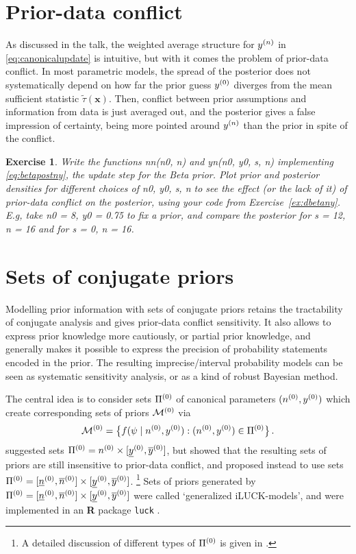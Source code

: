 \documentclass[12pt,a4paper	,twoside]{article}
\newcommand{\bs}[1]{\boldsymbol{#1}}
\renewcommand{\vec}[1]{{\bs#1}}
\newcommand{\code}[1]{\emph{\ttfamily #1}}
\newtheorem{myex}{Exercise}
\begin{document}
\section{Prior-data conflict}

As discussed in the talk, the weighted average structure for $y^{(n)}$ in \eqref{eq:canonicalupdate} is intuitive,
but with it comes the problem of prior-data conflict.
In most parametric models, the spread of the posterior does not systematically depend
on how far the prior guess $y^{(0)}$ diverges from the mean sufficient statistic $\tilde{\tau}(\vec{x})$.
Then, conflict between prior assumptions and information from data is just averaged out,
and the posterior gives a false impression of certainty,
being more pointed around $y^{(n)}$ than the prior in spite of the conflict.

\begin{myex}
Write the functions \code{nn(n0, n)} and \code{yn(n0, y0, s, n)}
implementing \eqref{eq:betapostny}, the update step for the Beta prior.
Plot prior and posterior densities for different choices of \code{n0, y0, s, n}
to see the effect (or the lack of it) of prior-data conflict on the posterior,
using your code from Exercise~\ref{ex:dbetany}.
E.g, take \code{n0 = 8}, \code{y0 = 0.75} to fix a prior,
and compare the posterior for \code{s = 12, n = 16} and for \code{s = 0, n = 16}.
\end{myex}


\section{Sets of conjugate priors}

Modelling prior information with sets of conjugate priors
retains the tractability of conjugate analysis and gives prior-data conflict sensitivity.
It also allows to express prior knowledge more cautiously, or partial prior knowledge,
and generally makes it possible to express the precision of probability statements encoded in the prior.
The resulting imprecise/interval probability models can be seen as systematic sensitivity analysis,
or as a kind of robust Bayesian method.

The central idea is to consider sets $\Pi^{(0)}$ of canonical parameters $(n^{(0)}, y^{(0)})$
which create corresponding sets of priors $\mathcal{M}^{(0)}$ via
\begin{align}
\mathcal{M}^{(0)} = \big\{f(\psi\mid n^{(0)},y^{(0)}) : (n^{(0)}, y^{(0)}) \in \Pi^{(0)}\big\}\,.
\end{align}
\textcite{2005:quaeghebeurcooman} suggested sets $\Pi^{(0)} = n^{(0)} \times [\underline{y}^{(0)},\overline{y}^{(0)}]$,
but \textcite{2009:WalterAugustin} showed that the resulting sets of priors are still insensitive to prior-data conflict,
and proposed instead to use sets $\Pi^{(0)} = [\underline{n}^{(0)}, \overline{n}^{(0)}] \times [\underline{y}^{(0)},\overline{y}^{(0)}]$.%
\footnote{A detailed discussion of different types of $\Pi^{(0)}$ is given in \textcite[\S 3.1]{2013:diss-gw}.}
Sets of priors generated by $\Pi^{(0)} = [\underline{n}^{(0)}, \overline{n}^{(0)}] \times [\underline{y}^{(0)},\overline{y}^{(0)}]$
were called `generalized iLUCK-models',
and were implemented in an \textbf{R} package \texttt{luck}
\parencite{luck-package}.
\end{document}
